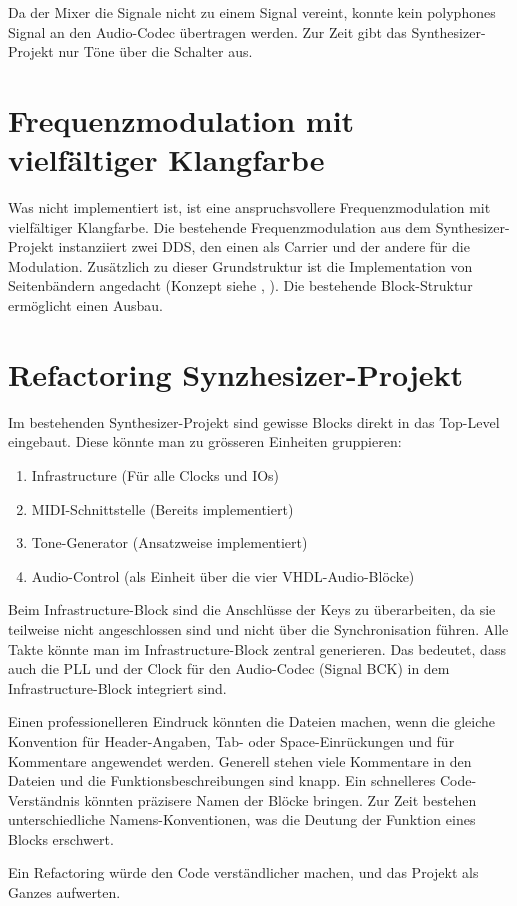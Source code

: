 Da der Mixer die Signale nicht zu einem Signal vereint, konnte kein polyphones Signal an den Audio-Codec übertragen werden. Zur Zeit gibt das Synthesizer-Projekt nur Töne über die Schalter aus.

\section{Frequenzmodulation mit vielfältiger Klangfarbe}

Was nicht implementiert ist, ist eine anspruchsvollere Frequenzmodulation mit vielfältiger Klangfarbe. Die bestehende Frequenzmodulation aus dem Synthesizer-Projekt instanziiert zwei DDS, den einen als Carrier und der andere für die Modulation. Zusätzlich zu dieser Grundstruktur ist die Implementation von Seitenbändern angedacht (Konzept siehe \cite{synthesizer_1}, \cite{synthesizer_2}). Die bestehende Block-Struktur ermöglicht einen Ausbau.

\section{Refactoring Synzhesizer-Projekt}

Im bestehenden Synthesizer-Projekt sind gewisse Blocks direkt in das Top-Level eingebaut. Diese könnte man zu grösseren Einheiten gruppieren:
\begin{enumerate}
 \item Infrastructure (Für alle Clocks und IOs)
 \item MIDI-Schnittstelle (Bereits implementiert)
 \item Tone-Generator (Ansatzweise implementiert)
 \item Audio-Control (als Einheit über die vier VHDL-Audio-Blöcke)
\end{enumerate}

Beim Infrastructure-Block sind die Anschlüsse der Keys zu überarbeiten, da sie teilweise nicht angeschlossen sind und nicht über die Synchronisation führen. Alle Takte könnte man im Infrastructure-Block zentral generieren. Das bedeutet, dass auch die PLL und der Clock für den Audio-Codec (Signal BCK) in dem Infrastructure-Block integriert sind.

Einen professionelleren Eindruck könnten die Dateien machen, wenn die gleiche Konvention für Header-Angaben, Tab- oder Space-Einrückungen und für Kommentare angewendet werden. Generell stehen viele Kommentare in den Dateien und die Funktionsbeschreibungen sind knapp. Ein schnelleres Code-Verständnis könnten präzisere Namen der Blöcke bringen. Zur Zeit bestehen unterschiedliche Namens-Konventionen, was die Deutung der Funktion eines Blocks erschwert.

Ein Refactoring würde den Code verständlicher machen, und das Projekt als Ganzes aufwerten.
